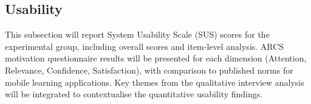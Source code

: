 \subsection{Usability}
\label{subsec:results_usability}

This subsection will report System Usability Scale (SUS) scores for the experimental group, including overall scores and item-level analysis. ARCS motivation questionnaire results will be presented for each dimension (Attention, Relevance, Confidence, Satisfaction), with comparison to published norms for mobile learning applications. Key themes from the qualitative interview analysis will be integrated to contextualise the quantitative usability findings.
